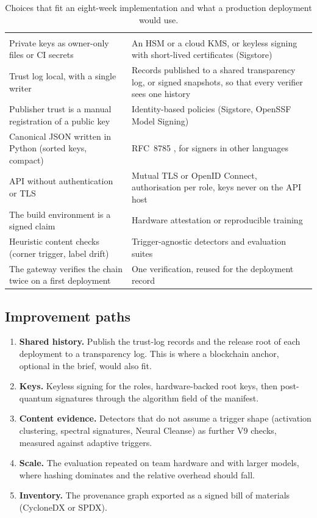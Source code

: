 {\tablefont
\begin{xltabular}{\textwidth}{P{6.6cm}L}
\caption{Choices that fit an eight-week implementation and what a production deployment would use.}\label{tab:production}\\
\toprule
\headrow{} &  \\
\midrule
\endfirsthead
\toprule
\headrow{} &  \\
\midrule
\endhead
\bottomrule
\endfoot
Private keys as owner-only files or CI secrets & An HSM or a cloud KMS, or keyless signing with short-lived certificates (Sigstore) \\
Trust log local, with a single writer & Records published to a shared transparency log, or signed snapshots, so that every verifier sees one history \\
Publisher trust is a manual registration of a public key & Identity-based policies (Sigstore, OpenSSF Model Signing) \\
Canonical JSON written in Python (sorted keys, compact) & RFC~8785 \cite{rfc8785}, for signers in other languages \\
API without authentication or TLS & Mutual TLS or OpenID Connect, authorisation per role, keys never on the API host \\
The build environment is a signed claim & Hardware attestation or reproducible training \\
Heuristic content checks (corner trigger, label drift) & Trigger-agnostic detectors and evaluation suites \\
The gateway verifies the chain twice on a first deployment & One verification, reused for the deployment record \\
\end{xltabular}}

\subsection{Improvement paths}
\begin{enumerate}
\item \textbf{Shared history.} Publish the trust-log records and the release root of each deployment to a
  transparency log. This is where a blockchain anchor, optional in the brief, would also fit.
\item \textbf{Keys.} Keyless signing for the roles, hardware-backed root keys, then post-quantum signatures
  through the algorithm field of the manifest.
\item \textbf{Content evidence.} Detectors that do not assume a trigger shape (activation clustering, spectral
  signatures, Neural Cleanse) as further V9 checks, measured against adaptive triggers.
\item \textbf{Scale.} The evaluation repeated on team hardware and with larger models, where hashing dominates
  and the relative overhead should fall.
\item \textbf{Inventory.} The provenance graph exported as a signed bill of materials (CycloneDX or SPDX).
\end{enumerate}
